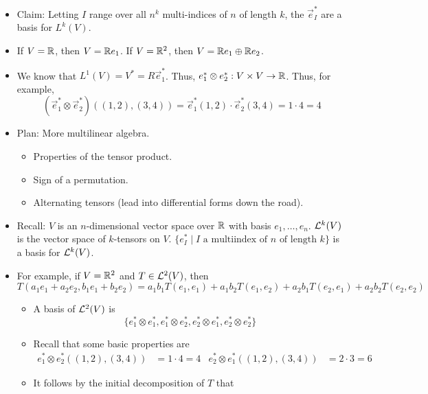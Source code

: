 \documentclass[../notes.tex]{subfiles}
\begin{document}
\begin{itemize}
    \item Claim: Letting $I$ range over all $n^k$ multi-indices of $n$ of length $k$, the $\vec{e}_I^*$ are a basis for $L^k(V)$.
    \item If $V=\R$, then $V=\R\vec{e}_1$. If $V=\R^2$, then $V=\R\vec{e}_1\oplus\R\vec{e}_2$.
    \item We know that $L^1(V)=V^*=R\vec{e}_1^*$. Thus, $\vec{e}_1^*\otimes\vec{e}_2^*:V\times V\to\R$. Thus, for example,
    \begin{equation*}
        (\vec{e}_1^*\otimes\vec{e}_2^*)((1,2),(3,4)) = \vec{e}_1^*(1,2)\cdot \vec{e}_2^*(3,4)
        = 1\cdot 4
        = 4
    \end{equation*}
    \item {}Plan: More multilinear algebra.
    \begin{itemize}
        \item Properties of the tensor product.
        \item Sign of a permutation.
        \item Alternating tensors (lead into differential forms down the road).
    \end{itemize}
    \item Recall: $V$ is an $n$-dimensional vector space over $\R$ with basis $e_1,\dots,e_n$. $\lin[k]{V}$ is the vector space of $k$-tensors on $V$. $\{e_I^*\mid I\text{ a multiindex of }n\text{ of length }k\}$ is a basis for $\lin[k]{V}$.
    \item For example, if $V=\R^2$ and $T\in\lin[2]{V}$, then
    \begin{equation*}
        T(a_1e_1+a_2e_2,b_1e_1+b_2e_2) = a_1b_1T(e_1,e_1)+a_1b_2T(e_1,e_2)+a_2b_1T(e_2,e_1)+a_2b_2T(e_2,e_2)
    \end{equation*}
    \begin{itemize}
        \item A basis of $\lin[2]{V}$ is
        \begin{equation*}
            \{e_1^*\otimes e_1^*,e_1^*\otimes e_2^*,e_2^*\otimes e_1^*,e_2^*\otimes e_2^*\}
        \end{equation*}
        \item Recall that some basic properties are
        \begin{align*}
            e_1^*\otimes e_2^*((1,2),(3,4)) &= 1\cdot 4 = 4&
            e_2^*\otimes e_1^*((1,2),(3,4)) &= 2\cdot 3 = 6
        \end{align*}
        \item It follows by the initial decomposition of $T$ that

\end{itemize}
\end{itemize}
\end{document}
